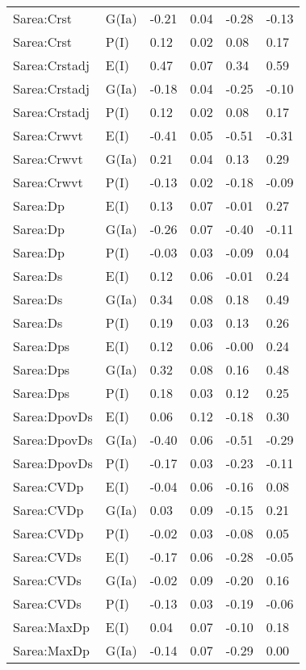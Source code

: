 \begin{center}
\begin{longtable}{|p{1.1in}|p{0.7in}|p{0.7in}|p{0.6in}|p{0.6in}|p{0.6in}|}
  Sarea:Crst & G(Ia) & -0.21 & 0.04 & -0.28 & -0.13 \\ 
  Sarea:Crst & P(I) & 0.12 & 0.02 & 0.08 & 0.17 \\ 
  Sarea:Crstadj & E(I) & 0.47 & 0.07 & 0.34 & 0.59 \\ 
  Sarea:Crstadj & G(Ia) & -0.18 & 0.04 & -0.25 & -0.10 \\ 
  Sarea:Crstadj & P(I) & 0.12 & 0.02 & 0.08 & 0.17 \\ 
  Sarea:Crwvt & E(I) & -0.41 & 0.05 & -0.51 & -0.31 \\ 
  Sarea:Crwvt & G(Ia) & 0.21 & 0.04 & 0.13 & 0.29 \\ 
  Sarea:Crwvt & P(I) & -0.13 & 0.02 & -0.18 & -0.09 \\ 
  Sarea:Dp & E(I) & 0.13 & 0.07 & -0.01 & 0.27 \\ 
  Sarea:Dp & G(Ia) & -0.26 & 0.07 & -0.40 & -0.11 \\ 
  Sarea:Dp & P(I) & -0.03 & 0.03 & -0.09 & 0.04 \\ 
  Sarea:Ds & E(I) & 0.12 & 0.06 & -0.01 & 0.24 \\ 
  Sarea:Ds & G(Ia) & 0.34 & 0.08 & 0.18 & 0.49 \\ 
  Sarea:Ds & P(I) & 0.19 & 0.03 & 0.13 & 0.26 \\ 
  Sarea:Dps & E(I) & 0.12 & 0.06 & -0.00 & 0.24 \\ 
  Sarea:Dps & G(Ia) & 0.32 & 0.08 & 0.16 & 0.48 \\ 
  Sarea:Dps & P(I) & 0.18 & 0.03 & 0.12 & 0.25 \\ 
  Sarea:DpovDs & E(I) & 0.06 & 0.12 & -0.18 & 0.30 \\ 
  Sarea:DpovDs & G(Ia) & -0.40 & 0.06 & -0.51 & -0.29 \\ 
  Sarea:DpovDs & P(I) & -0.17 & 0.03 & -0.23 & -0.11 \\ 
  Sarea:CVDp & E(I) & -0.04 & 0.06 & -0.16 & 0.08 \\ 
  Sarea:CVDp & G(Ia) & 0.03 & 0.09 & -0.15 & 0.21 \\ 
  Sarea:CVDp & P(I) & -0.02 & 0.03 & -0.08 & 0.05 \\ 
  Sarea:CVDs & E(I) & -0.17 & 0.06 & -0.28 & -0.05 \\ 
  Sarea:CVDs & G(Ia) & -0.02 & 0.09 & -0.20 & 0.16 \\ 
  Sarea:CVDs & P(I) & -0.13 & 0.03 & -0.19 & -0.06 \\ 
  Sarea:MaxDp & E(I) & 0.04 & 0.07 & -0.10 & 0.18 \\ 
  Sarea:MaxDp & G(Ia) & -0.14 & 0.07 & -0.29 & 0.00 \\ 

\end{longtable}
\end{center}
